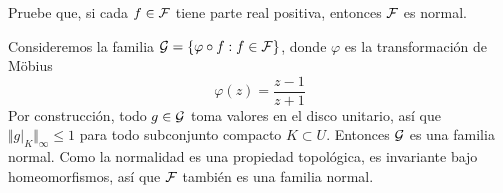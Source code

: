 \begin{exercise}
Pruebe que, si cada $f \in \mathcal F$ tiene parte real positiva, entonces $\mathcal F$ es normal.
\end{exercise}

\begin{solution}
Consideremos la familia $\mathcal G = \{ \varphi \circ f : f \in \mathcal F \}$, donde $\varphi$ es la transformación de Möbius
$$\varphi(z) = \frac {z-1} {z+1}$$
Por construcción, todo $g \in \mathcal G$ toma valores en el disco unitario, así que $\Vert g|_K \Vert_\infty \le 1$ para todo subconjunto compacto $K \subset U$. Entonces $\mathcal G$ es una familia normal. Como la normalidad es una propiedad topológica, es invariante bajo homeomorfismos, así que $\mathcal F$ también es una familia normal.
\end{solution}
